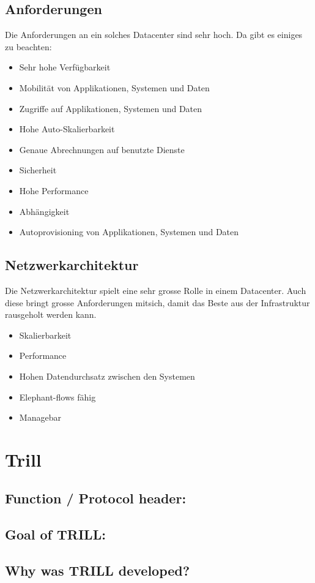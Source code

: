 \documentclass[a4,12pt]{scrartcl}
\begin{document}
\subsection{Anforderungen}
Die Anforderungen an ein solches Datacenter sind sehr hoch. Da gibt es einiges zu beachten: 
\begin{itemize}
\item Sehr hohe Verfügbarkeit 
\item Mobilität von Applikationen, Systemen und Daten
\item Zugriffe auf Applikationen, Systemen und Daten 
\item Hohe Auto-Skalierbarkeit 
\item Genaue Abrechnungen auf benutzte Dienste 
\item Sicherheit 
\item Hohe Performance 
\item Abhängigkeit 
\item Autoprovisioning von Applikationen, Systemen und Daten
\end{itemize}

\subsection{Netzwerkarchitektur}
Die Netzwerkarchitektur spielt eine sehr grosse Rolle in einem Datacenter. Auch diese bringt grosse Anforderungen mitsich, damit das Beste aus der Infrastruktur rausgeholt werden kann. 
\begin{itemize}
\item Skalierbarkeit
\item Performance 
\item Hohen Datendurchsatz zwischen den Systemen
\item Elephant-flows fähig 
\item Managebar 
\end{itemize}

\section{Trill}
\subsection{Function / Protocol header:} 
\subsection{Goal of TRILL:}
\subsection{Why was TRILL developed?}
\end{document}
